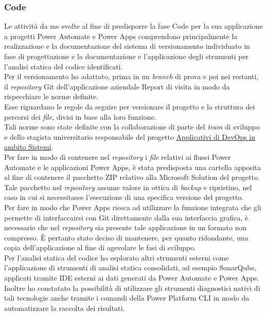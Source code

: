 \subsubsection*{Code}
Le attività da me svolte al fine di predisporre la fase Code per la sua applicazione a progetti Power Automate e Power Apps comprendono principalmente la realizzazione e la documentazione del sistema di versionamento individuato in fase di progettazione e la documentazione e l'applicazione degli strumenti per l'analisi statica del codice identificati.\\
Per il versionamento ho adattato, prima in un \emph{branch} di prova e poi nei restanti, il \emph{repository} Git dell'applicazione aziendale Report di visita in modo da rispecchiare le norme definite.\\
Esse riguardano le regole da seguire per versionare il progetto e la struttura dei percorsi dei \emph{file}, divisi in base alla loro funzione.\\  
Tali norme sono state definite con la collaborazione di parte del \emph{team} di sviluppo e dello stagista universitario responsabile del progetto \hyperref[stageDavide]{Applicativi di DevOps in ambito Sistemi}.\\ 
Per fare in modo di contenere nel \emph{repository} i \emph{file} relativi ai flussi Power Automate e le applicazioni Power Apps, è stata predisposta una cartella apposita al fine di contenere il pacchetto ZIP relativo alla Microsoft Solution del progetto.\\ 
Tale pacchetto nel \emph{repository} assume valore in ottica di \emph{backup} e ripristino, nel caso in cui si necessitasse l'esecuzione di una specifica versione del progetto.\\  
Per fare in modo che Power Apps riesca ad utilizzare la funzione integrata che gli permette di interfaccairsi con Git direttamente dalla sua interfaccia grafica, è necessario che nel \emph{repository} sia presente tale applicazione in un formato non compresso. È pertanto stato deciso di mantenere, per quanto ridondante, una copia dell'applicazione al fine di agevolare le fasi di sviluppo.\\ 
Per l'analisi statica del codice ho esplorato altri strumenti esterni come l'applicazione di strumenti di analisi statica consolidati, ad esempio SonarQube, applicati tramite IDE esterni ai dati generati da Power Automate e Power Apps.\\  
Inoltre ho constatato la possibilità di utilizzare gli strumenti diagnostici nativi di tali tecnologie anche tramite i comandi della Power Platform CLI in modo da automatizzare la raccolta dei risultati.\\ 
